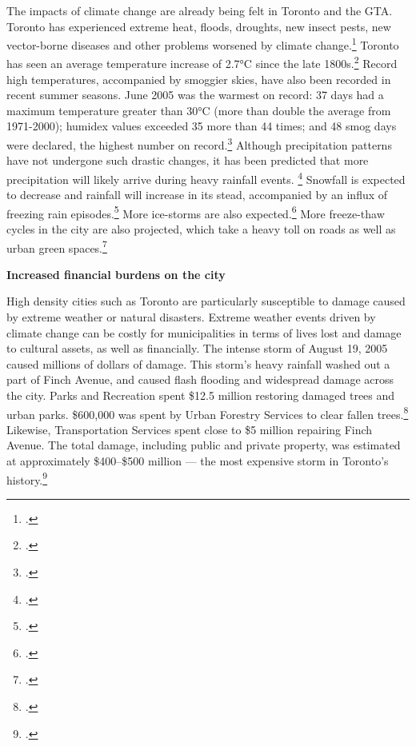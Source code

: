 \documentclass[10pt]{article}
\begin{document}
The impacts of climate change are already being felt in Toronto and the GTA.
Toronto has experienced extreme heat, floods, droughts, new insect pests, new vector-borne diseases and other problems worsened by climate change.\footcite[][]{TorontoAheadStorm}
Toronto has seen an average temperature increase of 2.7°C since the late 1800s.\footcite[][p. 5]{ScanCCToronto}
Record high temperatures, accompanied by smoggier skies, have also been recorded in recent summer seasons. 
June 2005 was the warmest on record: 37 days had a maximum temperature greater than 30°C (more than double the average from 1971-2000); humidex values exceeded 35 more than 44 times; and 48 smog days were declared, the highest number on record.\footcite[][p. iii, p. 7]{ScanCCToronto}
Although precipitation patterns have not undergone such drastic changes, it has been predicted that more precipitation will likely arrive during heavy rainfall events. \footcite[][p. 6]{ScanCCToronto}
Snowfall is expected to decrease and rainfall will increase in its stead, accompanied by an influx of freezing rain episodes.\footcite[][p. 8]{TorontoAheadStorm}
More ice-storms are also expected.\footcite[][]{FreezingRain2007}
More freeze-thaw cycles in the city are also projected, which take a heavy toll on roads as well as urban green spaces.\footcite[][p. 8]{TorontoAheadStorm}



\textbf{Increased financial burdens on the city}



High density cities such as Toronto are particularly susceptible to damage caused by extreme weather or natural disasters. 
Extreme weather events driven by climate change can be costly for municipalities in terms of lives lost and damage to cultural assets, as well as financially. 
The intense storm of August 19, 2005 caused millions of dollars of damage. 
This storm's heavy rainfall washed out a part of Finch Avenue, and caused flash flooding and widespread damage across the city. 
Parks and Recreation spent \$12.5 million restoring damaged trees and urban parks. 
\$600,000 was spent by Urban Forestry Services to clear fallen trees.\footcite[][p. iii]{ScanCCToronto}
Likewise, Transportation Services spent close to \$5 million repairing Finch Avenue. 
The total damage, including public and private property, was estimated at approximately \$400--\$500 million --- the most expensive storm in Toronto's history.\footcite[][p. 11]{TorontoAheadStorm}
\end{document}
